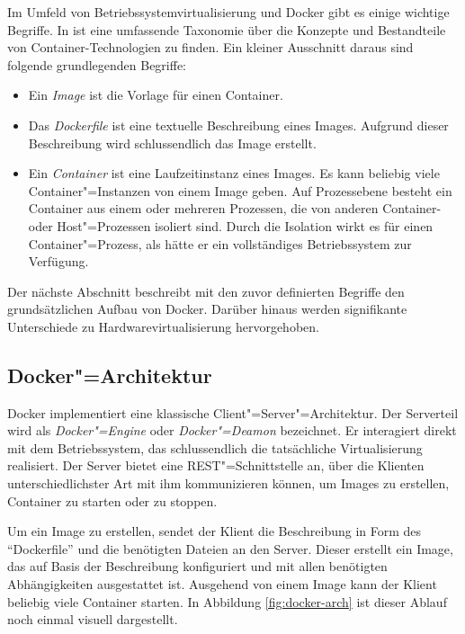 Im Umfeld von Betriebssystemvirtualisierung und Docker gibt es einige wichtige Begriffe. In \cite{paper_ernst_containers} ist eine umfassende Taxonomie über die Konzepte und Bestandteile von Container-Technologien zu finden. Ein kleiner Ausschnitt daraus sind folgende grundlegenden Begriffe:

\begin{itemize}
	\item Ein \textit{Image} ist die Vorlage für einen Container.
	\item Das \textit{Dockerfile} ist eine textuelle Beschreibung eines Images. Aufgrund dieser Beschreibung wird schlussendlich das Image erstellt.
	\item Ein \textit{Container} ist eine Laufzeitinstanz eines Images. Es kann beliebig viele Container"=Instanzen von einem Image geben. Auf Prozessebene besteht ein Container aus einem oder mehreren Prozessen, die von anderen Container- oder Host"=Prozessen isoliert sind. Durch die Isolation wirkt es für einen Container"=Prozess, als hätte er ein vollständiges Betriebssystem zur Verfügung.
\end{itemize}

Der nächste Abschnitt beschreibt mit den zuvor definierten Begriffe den grundsätzlichen Aufbau von Docker. Darüber hinaus werden signifikante Unterschiede zu Hardwarevirtualisierung hervorgehoben.

\subsection{Docker"=Architektur}

Docker implementiert eine klassische Client"=Server"=Architektur. Der Serverteil wird als \textit{Docker"=Engine} oder \textit{Docker"=Deamon} bezeichnet. Er interagiert direkt mit dem Betriebssystem, das schlussendlich die tatsächliche Virtualisierung realisiert. Der Server bietet eine REST"=Schnittstelle an, über die Klienten unterschiedlichster Art mit ihm kommunizieren können, um \zB Images zu erstellen, Container zu starten oder zu stoppen.

Um ein Image zu erstellen, sendet der Klient die Beschreibung in Form des "`Dockerfile"' und die benötigten Dateien an den Server. Dieser erstellt ein Image, das auf Basis der Beschreibung konfiguriert und mit allen benötigten Abhängigkeiten ausgestattet ist. Ausgehend von einem Image kann der Klient beliebig viele Container starten. In Abbildung \ref{fig:docker-arch} ist dieser Ablauf noch einmal visuell dargestellt.

